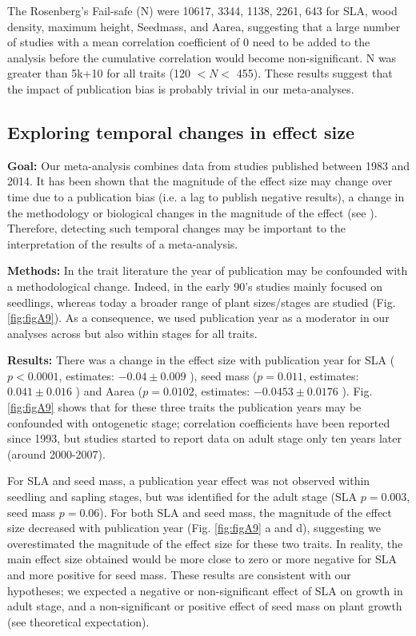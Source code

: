 \documentclass[10pt,twoside]{article}\usepackage[]{graphicx}\usepackage[]{color}
\begin{document}
The Rosenberg's Fail-safe (N) were 10617, 3344, 1138, 2261, 643 for SLA, wood density, maximum height, Seedmass, and Aarea, suggesting that a large number of studies with a mean correlation coefficient of 0 need to be added to the analysis before the cumulative correlation would become non-significant. N was greater than 5k+10 for all traits (120 $< N <$ 455).
These results suggest that the impact of publication bias is probably trivial in our meta-analyses.

\clearpage
\subsection{Exploring temporal changes in effect size}
\noindent\textbf{Goal:} Our meta-analysis combines data from studies published between 1983 and 2014. It has been shown that the magnitude of the effect size may change over time due to a publication bias (i.e. a lag to publish negative results), a change in the methodology or biological changes in the magnitude of the effect (see \citealt{Koricheva:2013hy}). Therefore, detecting such temporal changes may be important to the interpretation of the results of a meta-analysis.

\noindent\textbf{Methods:} In the trait literature the year of publication may be confounded with a methodological change. Indeed, in the early 90's studies mainly focused on seedlings, whereas today a broader range of plant sizes/stages are studied (Fig. \ref{fig:figA9}). As a consequence, we used publication year as a moderator in our analyses \citep{Zvereva:2008jm} across but also within stages for all traits.

\noindent\textbf{Results:} There was a change in the effect size with publication year for SLA ($p<0.0001$, estimates: $-0.04 \pm 0.009$ ), seed mass ($p = 0.011$, estimates: $0.041 \pm 0.016$ ) and Aarea ($p = 0.0102$, estimates: $-0.0453 \pm 0.0176$ ). Fig. \ref{fig:figA9} shows that for these three traits the publication years may be confounded with ontogenetic stage; correlation coefficients have been reported since 1993, but studies started to report data on adult stage only ten years later (around 2000-2007).

For SLA and seed mass, a publication year effect was not observed within seedling and sapling stages, but was identified for the adult stage (SLA $p = 0.003$, seed mass $p = 0.06$). For both SLA and seed mass, the magnitude of the effect size decreased with publication year (Fig. \ref{fig:figA9} a and d), suggesting we overestimated the magnitude of the effect size for these two traits. In reality, the main effect size obtained would be more close to zero or more negative for SLA and more positive for seed mass. These results are consistent with our hypotheses; we expected a negative or non-significant effect of SLA on growth in adult stage, and a non-significant or positive effect of seed mass on plant growth (see theoretical expectation).
\end{document}
